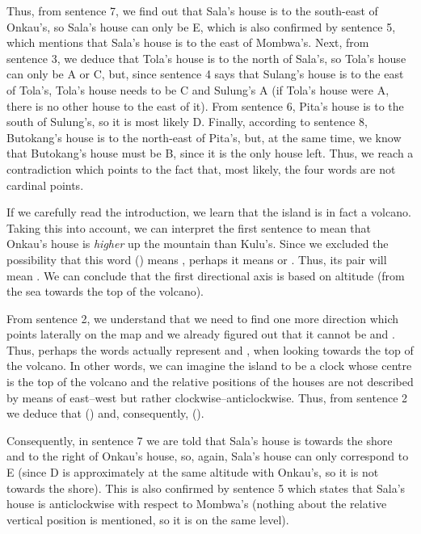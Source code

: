 \begin{refsection}
\begin{mysolution}
Thus, from sentence 7, we find out that Sala's house is to the south-east of Onkau's, so Sala's house can only be E, which is also confirmed by sentence 5, which mentions that Sala's house is to the east of Mombwa's. Next, from sentence 3, we deduce that Tola's house is to the north of Sala's, so Tola's house can only be A or C, but, since sentence 4 says that Sulang's house is to the east of Tola's, Tola's house needs to be C and Sulung's A (if Tola's house were A, there is no other house to the east of it). From sentence 6, Pita's house is to the south of Sulung's, so it is most likely D. Finally, according to sentence 8, Butokang's house is to the north-east of Pita's, but, at the same time, we know that Butokang's house must be B, since it is the only house left. Thus, we reach a contradiction which points to the fact that, most likely, the four words are not cardinal points.

If we carefully read the introduction, we learn that the island is in fact a volcano. Taking this into account, we can interpret the first sentence to mean that Onkau's house is \textit{higher} up the mountain than Kulu's. Since we excluded the possibility that this word () means , perhaps it means  or . Thus, its pair  will mean . We can conclude that the first directional axis is based on altitude (from the sea towards the top of the volcano).

From sentence 2, we understand that we need to find one more direction which points laterally on the map  and we already figured out that it cannot be  and . Thus, perhaps the words actually represent  and , when looking towards the top of the volcano. In other words, we can imagine the island to be a clock whose centre is the top of the volcano and the relative positions of the houses are not described by means of east--west but rather clockwise--anticlockwise. Thus, from sentence 2 we deduce that  () and, consequently,  ().

Consequently, in sentence 7 we are told that Sala's house is towards the shore and to the right of Onkau's house, so, again, Sala's house can only correspond to E (since D is approximately at the same altitude with Onkau's, so it is not towards the shore). This is also confirmed by sentence 5 which states that Sala's house is anticlockwise with respect to Mombwa's (nothing about the relative vertical position is mentioned, so it is on the same level).


\end{mysolution}
\end{refsection}
